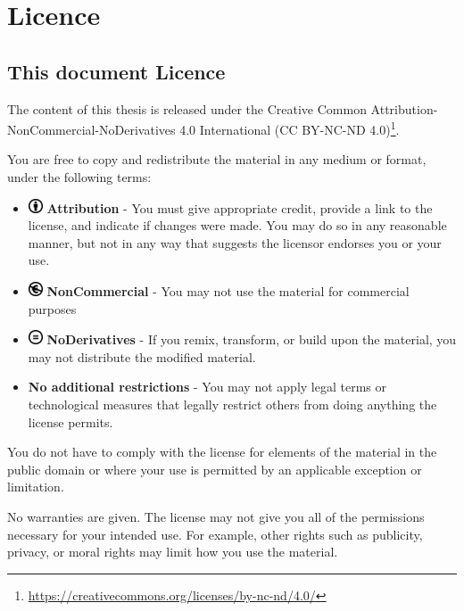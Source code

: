 \section{Licence}
\label{sec:licence}

\subsection{This document Licence}
The content of this thesis is released under the Creative Common Attribution-NonCommercial-NoDerivatives 4.0 International ({CC BY-NC-ND 4.0})\footnote{\url{https://creativecommons.org/licenses/by-nc-nd/4.0/}}. 

You are free to copy and redistribute the material in any medium or format, under the following terms:
\begin{itemize}
    \item \includegraphics[width=12pt]{images/CreativeCommons/by.eps}\textbf{ Attribution} - You must give appropriate credit, provide a link to the license, and indicate if changes were made. You may do so in any reasonable manner, but not in any way that suggests the licensor endorses you or your use.
    \item \includegraphics[width=12pt]{images/CreativeCommons/nc-eu.eps}\textbf{ NonCommercial} - You may not use the material for commercial purposes 
    \item \includegraphics[width=12pt]{images/CreativeCommons/nd.eps}\textbf{ NoDerivatives} - If you remix, transform, or build upon the material, you may not distribute the modified material.
    \item \textbf{No additional restrictions} - You may not apply legal terms or technological measures that legally restrict others from doing anything the license permits.
\end{itemize}

You do not have to comply with the license for elements of the material in the public domain or where your use is permitted by an applicable exception or limitation.

No warranties are given. The license may not give you all of the permissions necessary for your intended use. For example, other rights such as publicity, privacy, or moral rights may limit how you use the material.

